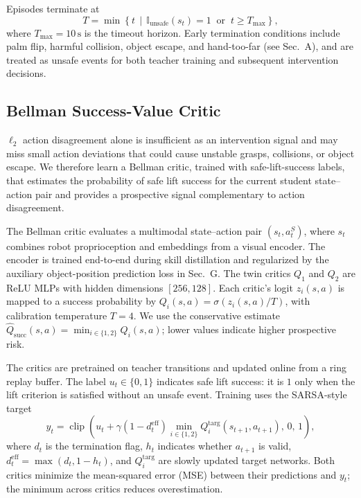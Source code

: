 

Episodes terminate at
\begingroup
\small
\begin{equation}
T = \min\left\{t \,\middle|\, \mathbb{I}_{\mathrm{unsafe}}(s_t)=1
\;\;\text{or}\;\; t \ge T_{\max}\right\},
\end{equation}
\endgroup
where $T_{\max}=10\,\mathrm{s}$ is the timeout horizon. Early termination
conditions include palm flip, harmful collision, object escape, and hand-too-far
(see Sec.~A), and are treated as unsafe events for both teacher training and
subsequent intervention decisions.

\subsection{Bellman Success-Value Critic}
$\ell_2$ action disagreement alone is insufficient as an intervention signal and may miss small
action deviations that could cause unstable grasps, collisions, or object escape.
We therefore learn a Bellman critic, trained with safe-lift-success labels, that estimates the
probability of safe lift success for the current student state--action pair and provides a
prospective signal complementary to action disagreement.

The Bellman critic evaluates a multimodal state--action pair $(s_t,a_t^S)$, where
$s_t$ combines robot proprioception and embeddings from a visual encoder. The
encoder is trained end-to-end during skill distillation and regularized by the
auxiliary object-position prediction loss in Sec.~G. The twin critics
$Q_1$ and $Q_2$ are ReLU MLPs with hidden dimensions $[256,128]$. Each critic's
logit $z_i(s,a)$ is mapped to a success probability by
$Q_i(s,a)=\sigma(z_i(s,a)/T)$, with calibration temperature $T=4$.
We use the conservative estimate
$\hat Q_{\mathrm{succ}}(s,a)=\min_{i\in\{1,2\}}Q_i(s,a)$; lower values indicate
higher prospective risk.

The critics are pretrained on teacher transitions and updated online from a ring
replay buffer. The label $u_t\in\{0,1\}$ indicates safe lift success: it is $1$
only when the lift criterion is satisfied without an unsafe event. Training
uses the SARSA-style target
\begingroup
\small
\begin{equation}
y_t=
\operatorname{clip}\!\left(
u_t+\gamma(1-d_t^{\mathrm{eff}})
\min_{i\in\{1,2\}}Q_i^{\mathrm{targ}}(s_{t+1},a_{t+1}),
\,0,\,1\right),
\label{eq:success_target}
\end{equation}
\endgroup
where $d_t$ is the termination flag, $h_t$ indicates whether $a_{t+1}$ is valid,
$d_t^{\mathrm{eff}}=\max(d_t,1-h_t)$, and $Q_i^{\mathrm{targ}}$ are slowly
updated target networks. Both critics minimize the mean-squared error (MSE)
between their predictions and $y_t$; the minimum across critics reduces overestimation.

